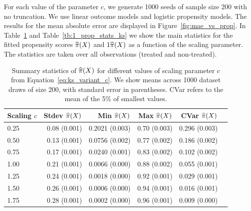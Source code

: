 For each value of the parameter $c$, we generate 1000 seeds of sample size 200 with no truncation. We use linear outcome models and logistic propensity models. The results for the mean absolute error are displayed in
Figure~\ref{fig:mae_vs_prop}. In Table~\ref{tb:prop_stats_ks} and Table~\ref{tb:1_prop_stats_ks} we show the main statistics for the fitted propensity scores $\widehat{\pi} (X)$ and $1\widehat{\pi}(X)$ as a function of the scaling parameter. The statistics are taken over all observations (treated and non-treated).
  
\begin{table}[ht]
\centering
\footnotesize
\begin{tabular}{lrrrrr}
  \toprule
Scaling $c$ & Stdev $\widehat{\pi}(X)$  & Min $\widehat{\pi}(X)$ & Max $\widehat{\pi}(X)$ & CVar $\widehat{\pi}(X)$ \\ 
  \midrule
0.25 & 0.08 (0.001) & 0.2021 (0.003) & 0.70 (0.003) & 0.296 (0.003) \\ 
  0.50 & 0.13 (0.001) & 0.0756 (0.002) & 0.77 (0.002) & 0.186 (0.002) \\ 
  0.75 & 0.17 (0.001) & 0.0240 (0.001) & 0.83 (0.002) & 0.102 (0.002)\\ 
  1.00 & 0.21 (0.001) & 0.0066 (0.000) & 0.88 (0.002) & 0.055 (0.001)\\ 
  1.25 & 0.24 (0.001) & 0.0018 (0.000) & 0.92 (0.001)& 0.029 (0.001)\\ 
  1.50 & 0.26 (0.001) & 0.0006 (0.000) & 0.94 (0.001)& 0.016 (0.001)\\ 
  1.75 & 0.28 (0.001) & 0.0002 (0.000) & 0.96 (0.001) & 0.009 (0.000) \\ 
   \bottomrule
\end{tabular}
\caption{Summary statistics of $\widehat{\pi}(X)$ for different values of scaling parameter $c$ from Equation~\eqref{eq:ks_variant_c}. We show means across 1000 dataset draws of size 200, with standard error in parentheses. CVar refers to the mean of the 5\% of smallest values.}
\label{tb:prop_stats_ks}
\end{table}
  
